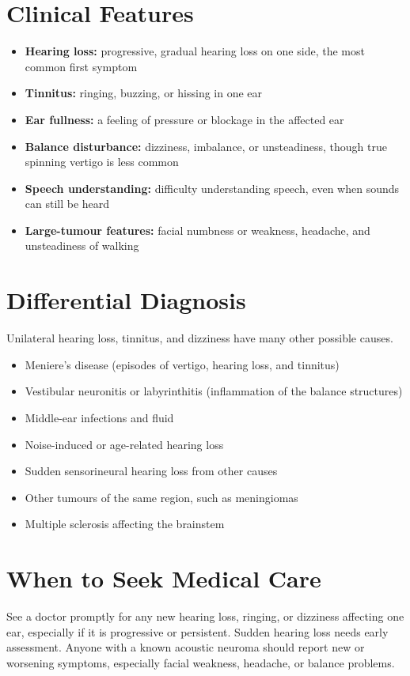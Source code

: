 \section*{Clinical Features}
\begin{itemize}
    \item \textbf{Hearing loss:} progressive, gradual hearing loss on one side, the most common first symptom
    \item \textbf{Tinnitus:} ringing, buzzing, or hissing in one ear
    \item \textbf{Ear fullness:} a feeling of pressure or blockage in the affected ear
    \item \textbf{Balance disturbance:} dizziness, imbalance, or unsteadiness, though true spinning vertigo is less common
    \item \textbf{Speech understanding:} difficulty understanding speech, even when sounds can still be heard
    \item \textbf{Large-tumour features:} facial numbness or weakness, headache, and unsteadiness of walking
\end{itemize}

\section*{Differential Diagnosis}
Unilateral hearing loss, tinnitus, and dizziness have many other possible causes.

\begin{itemize}
    \item Meniere's disease (episodes of vertigo, hearing loss, and tinnitus)
    \item Vestibular neuronitis or labyrinthitis (inflammation of the balance structures)
    \item Middle-ear infections and fluid
    \item Noise-induced or age-related hearing loss
    \item Sudden sensorineural hearing loss from other causes
    \item Other tumours of the same region, such as meningiomas
    \item Multiple sclerosis affecting the brainstem
\end{itemize}

\section*{When to Seek Medical Care}
See a doctor promptly for any new hearing loss, ringing, or dizziness affecting one ear, especially if it is progressive or persistent. Sudden hearing loss needs early assessment. Anyone with a known acoustic neuroma should report new or worsening symptoms, especially facial weakness, headache, or balance problems.

